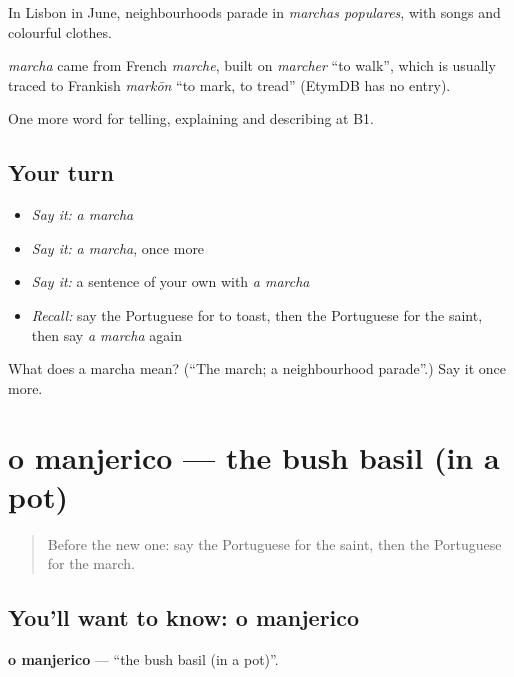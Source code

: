 In Lisbon in June, neighbourhoods parade in \emph{marchas populares}, with songs and colourful clothes.

\begin{cousinweb}
\emph{marcha} came from French \emph{marche}, built on \emph{marcher} \textquotedblleft{}to walk\textquotedblright{}, which is usually traced to Frankish \emph{markōn} \textquotedblleft{}to mark, to tread\textquotedblright{} (EtymDB has no entry).
\end{cousinweb}

\begin{grammarlens}[title={What you've built}]
One more word for telling, explaining and describing at B1.
\end{grammarlens}

\subsection*{Your turn}
\begin{itemize}
\raggedright
  \item \emph{Say it:} \emph{a marcha}
  \item \emph{Say it:} \emph{a marcha}, once more
  \item \emph{Say it:} a sentence of your own with \emph{a marcha}
  \item \emph{Recall:} say the Portuguese for to toast, then the Portuguese for the saint, then say \emph{a marcha} again
\end{itemize}

\begin{tcolorbox}[breakable,colback=teal!4,colframe=teal!35!black,title={Before you move on}]
What does a marcha mean? (\textquotedblleft{}The march; a neighbourhood parade\textquotedblright{}.) Say it once more.
\end{tcolorbox}
\section[o manjerico]{o manjerico — the bush basil (in a pot)}

\label{lesson:PT-C319-manjerico}



\begin{quote}
Before the new one: say the Portuguese for the saint, then the Portuguese for the march.
\end{quote}

\subsection*{You'll want to know: o manjerico}
\textbf{o manjerico} — \textquotedblleft{}the bush basil (in a pot)\textquotedblright{}.

